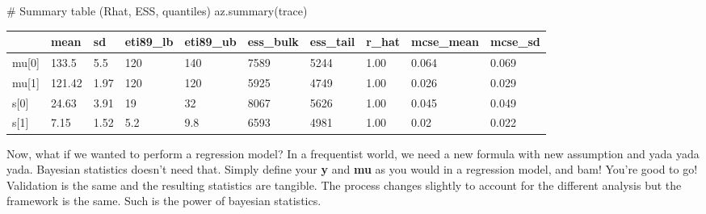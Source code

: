 \documentclass[
  letterpaper,
  DIV=11,
  numbers=noendperiod]{scrartcl}
\newenvironment{Shaded}{\begin{snugshade}}{\end{snugshade}}
\newcommand{\CommentTok}[1]{\textcolor[rgb]{0.37,0.37,0.37}{#1}}
\newcommand{\NormalTok}[1]{\textcolor[rgb]{0.00,0.23,0.31}{#1}}
\newcounter{none} %
\begin{document}
\begin{Shaded}
\begin{Highlighting}[]
\CommentTok{\# Summary table (Rhat, ESS, quantiles)}
\NormalTok{az.summary(trace)}
\end{Highlighting}
\end{Shaded}

{\def\LTcaptype{none} %
\begin{longtable}[]{@{}llllllllll@{}}
\toprule\noalign{}
& mean & sd & eti89\_lb & eti89\_ub & ess\_bulk & ess\_tail & r\_hat &
mcse\_mean & mcse\_sd \\
\midrule\noalign{}
\endhead
\bottomrule\noalign{}
\endlastfoot
mu{[}0{]} & 133.5 & 5.5 & 120 & 140 & 7589 & 5244 & 1.00 & 0.064 &
0.069 \\
mu{[}1{]} & 121.42 & 1.97 & 120 & 120 & 5925 & 4749 & 1.00 & 0.026 &
0.029 \\
s{[}0{]} & 24.63 & 3.91 & 19 & 32 & 8067 & 5626 & 1.00 & 0.045 &
0.049 \\
s{[}1{]} & 7.15 & 1.52 & 5.2 & 9.8 & 6593 & 4981 & 1.00 & 0.02 &
0.022 \\
\end{longtable}
}

Now, what if we wanted to perform a regression model? In a frequentist
world, we need a new formula with new assumption and yada yada yada.
Bayesian statistics doesn't need that. Simply define your \textbf{y} and
\textbf{mu} as you would in a regression model, and bam! You're good to
go! Validation is the same and the resulting statistics are tangible.
The process changes slightly to account for the different analysis but
the framework is the same. Such is the power of bayesian statistics.
\end{document}
